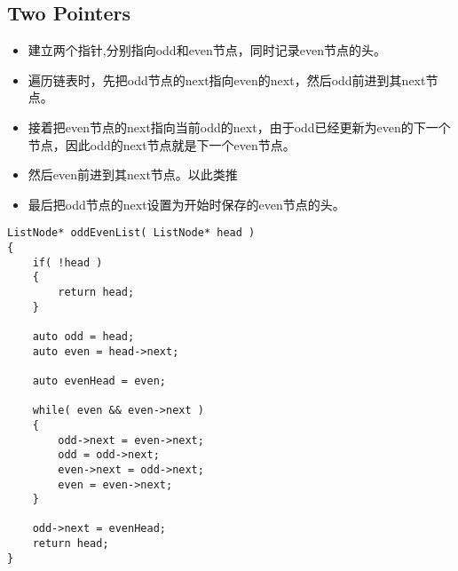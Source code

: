 \subsection{Two Pointers}
\begin{itemize}
\item 建立两个指针,分别指向odd和even节点，同时记录even节点的头。
\item 遍历链表时，先把odd节点的next指向even的next，然后odd前进到其next节点。
\item 接着把even节点的next指向当前odd的next，由于odd已经更新为even的下一个节点，因此odd的next节点就是下一个even节点。
\item 然后even前进到其next节点。以此类推
\item 最后把odd节点的next设置为开始时保存的even节点的头。
\end{itemize}

\setcounter{lstlisting}{0}
\begin{lstlisting}[style=customc, caption={Two Pointers}]
ListNode* oddEvenList( ListNode* head )
{
    if( !head )
    {
        return head;
    }

    auto odd = head;
    auto even = head->next;

    auto evenHead = even;

    while( even && even->next )
    {
        odd->next = even->next;
        odd = odd->next;
        even->next = odd->next;
        even = even->next;
    }

    odd->next = evenHead;
    return head;
}
\end{lstlisting}